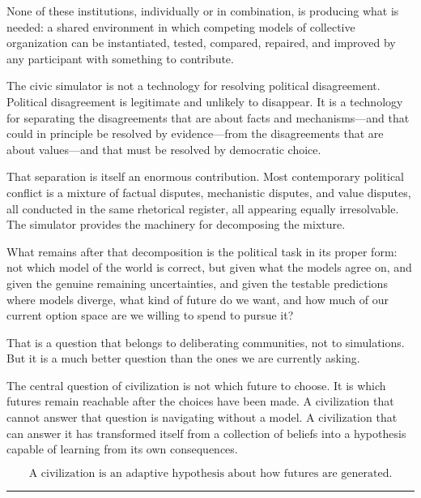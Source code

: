 \documentclass[12pt]{article}
\begin{document}
None of these institutions, individually or in combination, is producing what is needed: a shared environment in which competing models of collective organization can be instantiated, tested, compared, repaired, and improved by any participant with something to contribute.

The civic simulator is not a technology for resolving political disagreement. Political disagreement is legitimate and unlikely to disappear. It is a technology for separating the disagreements that are about facts and mechanisms---and that could in principle be resolved by evidence---from the disagreements that are about values---and that must be resolved by democratic choice.

That separation is itself an enormous contribution. Most contemporary political conflict is a mixture of factual disputes, mechanistic disputes, and value disputes, all conducted in the same rhetorical register, all appearing equally irresolvable. The simulator provides the machinery for decomposing the mixture.

What remains after that decomposition is the political task in its proper form: not which model of the world is correct, but given what the models agree on, and given the genuine remaining uncertainties, and given the testable predictions where models diverge, what kind of future do we want, and how much of our current option space are we willing to spend to pursue it?

That is a question that belongs to deliberating communities, not to simulations. But it is a much better question than the ones we are currently asking.

The central question of civilization is not which future to choose. It is which futures remain reachable after the choices have been made. A civilization that cannot answer that question is navigating without a model. A civilization that can answer it has transformed itself from a collection of beliefs into a hypothesis capable of learning from its own consequences.

\begin{equation}
  \boxed{\text{A civilization is an adaptive hypothesis about how futures are generated.}}
\end{equation}

\vspace{2em}

\noindent\rule{\linewidth}{0.4pt}

\vspace{0.5em}
\end{document}
